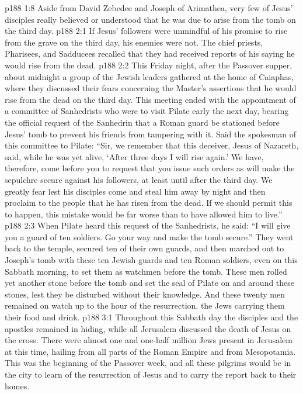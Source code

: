 \vs p188 1:8 Aside from David Zebedee and Joseph of Arimathea, very few of Jesus’ disciples really believed or understood that he was due to arise from the tomb on the third day.\plusone
{}
\vs p188 2:1 If Jesus’ followers were unmindful of his promise to rise from the grave on the third day, his enemies were not. The chief priests, Pharisees, and Sadducees recalled that they had received reports of his saying he would rise from the dead.
\vs p188 2:2 This Friday night, after the Passover supper, about midnight a group of the Jewish leaders gathered at the home of Caiaphas, where they discussed their fears concerning the Master’s assertions that he would rise from the dead on the third day. This meeting ended with the appointment of a committee of Sanhedrists who were to visit Pilate early the next day, bearing the official request of the Sanhedrin that a Roman guard be stationed before Jesus’ tomb to prevent his friends from tampering with it. Said the spokesman of this committee to Pilate: “Sir, we remember that this deceiver, Jesus of Nazareth, said, while he was yet alive, ‘After three days I will rise again.’ We have, therefore, come before you to request that you issue such orders as will make the sepulchre secure against his followers, at least until after the third day. We greatly fear lest his disciples come and steal him away by night and then proclaim to the people that he has risen from the dead. If we should permit this to happen, this mistake would be far worse than to have allowed him to live.”
\vs p188 2:3 When Pilate heard this request of the Sanhedrists, he said: “I will give you a guard of ten soldiers. Go your way and make the tomb secure.” They went back to the temple, secured ten of their own guards, and then marched out to Joseph’s tomb with these ten Jewish guards and ten Roman soldiers, even on this Sabbath morning, to set them as watchmen before the tomb. These men rolled yet another stone before the tomb and set the seal of Pilate on and around these stones, lest they be disturbed without their knowledge. And these twenty men remained on watch up to the hour of the resurrection, the Jews carrying them their food and drink.
\vs p188 3:1 Throughout this Sabbath day the disciples and the apostles remained in hiding, while all Jerusalem discussed the death of Jesus on the cross. There were almost one and one\hyp{}half million Jews present in Jerusalem at this time, hailing from all parts of the Roman Empire and from Mesopotamia. This was the beginning of the Passover week, and all these pilgrims would be in the city to learn of the resurrection of Jesus and to carry the report back to their homes.
